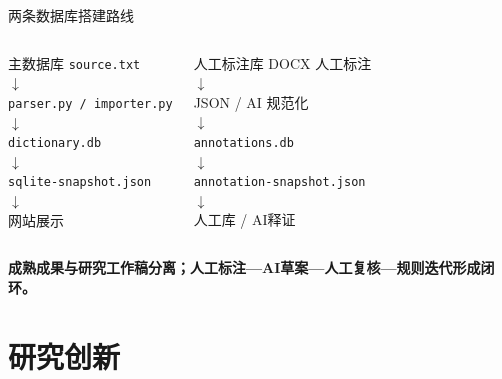 \documentclass[aspectratio=169]{beamer}
\newcommand{\key}[1]{\textcolor{rucRed}{\textbf{#1}}}
\begin{document}
\begin{frame}{两条数据库搭建路线}
    \begin{columns}[T]
        \begin{exampleblock}{主数据库}
            \centering
            \texttt{source.txt}\\
            $\downarrow$\\
            \texttt{parser.py / importer.py}\\
            $\downarrow$\\
            \texttt{dictionary.db}\\
            $\downarrow$\\
            \texttt{sqlite-snapshot.json}\\
            $\downarrow$\\
            网站展示
        \end{exampleblock}
        \begin{exampleblock}{人工标注库}
            \centering
            DOCX 人工标注\\
            $\downarrow$\\
            JSON / AI 规范化\\
            $\downarrow$\\
            \texttt{annotations.db}\\
            $\downarrow$\\
            \texttt{annotation-snapshot.json}\\
            $\downarrow$\\
            人工库 / AI释证
        \end{exampleblock}
    \end{columns}
    \vspace{0.25cm}
    \begin{center}
        \key{成熟成果与研究工作稿分离；人工标注—AI草案—人工复核—规则迭代形成闭环。}
    \end{center}
\end{frame}

\section{研究创新}
\end{document}
